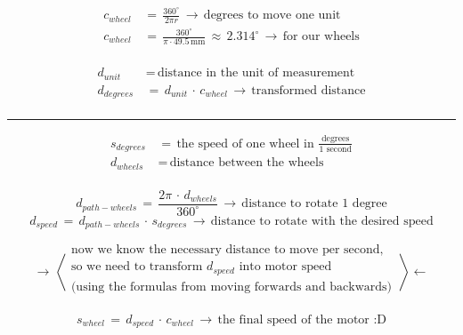 \documentclass{article}
\begin{document}
    \begin{align*}
        c_{wheel}\, &=\, \frac{360^{\circ}}{2\pi r}\, \longrightarrow\, \text{degrees to move one unit} \\
        c_{wheel}\, &=\, \frac{360^{\circ}}{\pi \cdot 49.5\, \text{mm}}\, \approx\, 2.314^{\circ}\, \longrightarrow\, \text{for our wheels} \\
    \end{align*}

    \begin{align*}    
        d_{unit}\, &=\, \text{distance in the unit of measurement} \\
        d_{degrees}\, &=\, d_{unit}\, \cdot\, c_{wheel}\, \longrightarrow\, \text{transformed distance} \\
    \end{align*}
    
    \bigbreak %
    \hrule %
    \bigbreak %

    \begin{align*}
        s_{degrees}\, &=\, \textstyle\text{the speed of one wheel in $\frac{\text{degrees}}{\text{$1$ second}}$} \\
        d_{wheels}\, &=\, \text{distance between the wheels}  \\
    \end{align*}

    \[d_{path-wheels}\, =\, \frac{2\pi\, \cdot\, d_{wheels}}{360^{\circ}}\, \longrightarrow\, \text{distance to rotate $1$ degree}\] 
    \[d_{speed}\, =\, d_{path-wheels}\, \cdot\, s_{degrees}\, \longrightarrow\, \text{distance to rotate with the desired speed}\]
    
    \[\rightarrow\, \left\langle \begin{array}{c}
        \text{now we know the necessary distance to move per second,} \\
        \text{so we need to transform $d_{speed}$ into motor speed} \\
        \text{(using the formulas from moving forwards and backwards)} \\
    \end{array}\, \right\rangle \leftarrow\]

    \[s_{wheel}\, =\, d_{speed}\, \cdot\, c_{wheel}\, \longrightarrow\, \text{the final speed of the motor :D}\]
\end{document}
